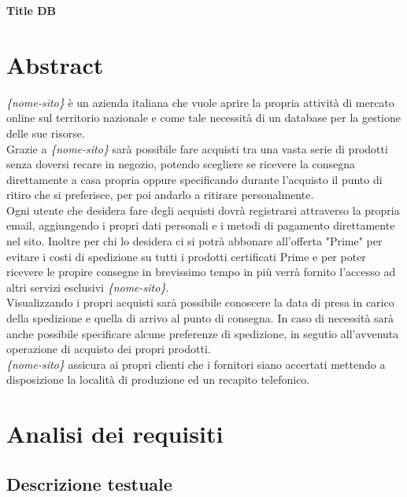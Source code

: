 \documentclass[11pt]{article}
\begin{document}
\begin{center}
    \huge\textbf{Title DB}
\end{center}

\section{\textbf{Abstract}}

\textit{\{nome-sito\}} è un azienda italiana che vuole aprire la propria attività di mercato online
sul territorio nazionale e come tale necessità di un database per la gestione delle sue risorse.\\
Grazie a \textit{\{nome-sito\}} sarà possibile fare acquisti tra una vasta serie di prodotti 
senza doversi recare in negozio, potendo scegliere se ricevere la consegna direttamente a casa
propria oppure specificando durante l'acquisto il punto di ritiro che si preferisce,
per poi andarlo a ritirare personalmente.\\
Ogni utente che desidera fare degli acquisti dovrà registrarsi attraverso la propria email,
aggiungendo i propri dati personali e i metodi di pagamento direttamente nel sito.
Inoltre per chi lo desidera ci si potrà abbonare all'offerta "Prime" per evitare i costi di spedizione
su tutti i prodotti certificati Prime e per poter ricevere le propire consegne in brevissimo tempo
in più verrà fornito l'accesso ad altri servizi esclusivi \textit{\{nome-sito\}}.\\
Visualizzando i propri acquisti sarà possibile conoscere la data di presa in carico della spedizione
e quella di arrivo al punto di consegna. In caso di necessità sarà anche possibile specificare alcune preferenze
di spedizione, in segutio all'avvenuta operazione di acquisto dei propri prodotti.\\
\textit{\{nome-sito\}} assicura ai propri clienti che i fornitori siano accertati mettendo a disposizione
la località di produzione ed un recapito telefonico.

\section{Analisi dei requisiti}

\subsection{Descrizione testuale}
\end{document}
